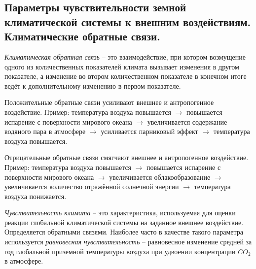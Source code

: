 \subsection{Параметры чувствительности земной климатической системы к внешним воздействиям. Климатические обратные связи.}
\textit{Климатическая обратная связь} -- это взаимодействие, при котором возмущение одного из количественных показателей климата вызывает изменения в другом показателе, а изменение во втором количественном показателе в конечном итоге ведёт к дополнительному изменению в первом показателе.

Положительные обратные связи усиливают внешнее и антропогенное воздействие. Пример: температура воздуха повышается $\rightarrow$ повышается испарение с поверхности мирового океана $\rightarrow$ увеличивается содержание водяного пара в атмосфере $\rightarrow$ усиливается парниковый эффект $\rightarrow$ температура воздуха повышается.

Отрицательные обратные связи смягчают внешнее и антропогенное воздействие. Пример: температура воздуха повышается $\rightarrow$ повышается испарение с поверхности мирового океана $\rightarrow$ увеличивается облакообразование $\rightarrow$ увеличивается количество отражённой солнечной энергии $\rightarrow$ температура воздуха понижается.

\textit{Чувствительность климата} -- это характеристика, используемая для оценки реакции глобальной климатической системы на заданное внешнее воздействие.
Определяется обратными связями.
Наиболее часто в качестве такого параметра используется \textit{равновесная чувствительность} -- равновесное изменение средней за год глобальной приземной температуры воздуха при удвоении концентрации $CO_2$ в атмосфере.
